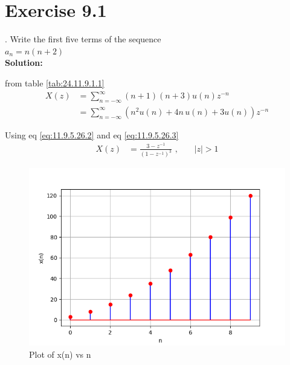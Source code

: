 \documentclass[journal,12pt,twocolumn]{IEEEtran}
\providecommand{\brak}[1]{\ensuremath{\left(#1\right)}}
\theoremstyle{remark}
\providecommand{\abs}[1]{\left\vert#1\right\vert}
\newcommand{\solution}{\noindent \textbf{Solution: }}
\begin{document}


\vspace{3cm}

\title{}
\author{EE23BTECH11024 - G.Karthik Yadav$^{*}$
}
\maketitle
\newpage
\bigskip




\section*{Exercise 9.1}
. \hspace{2pt}Write the first five terms of the sequence\\
$a_n = n \brak{n+2}$\\

\solution
\fi





from table \ref{tab:24.11.9.1.1}
\begin{align}
    X \brak{z} & = \sum_{n=-\infty}^{\infty}  \brak{n+1}\brak{n+3} u \brak{n}   z^{-n}  \\
    & = \sum_{n=-\infty}^{\infty}  \brak{n^{2}u\brak{n} + 4 n\, u\brak{n}  + 3u\brak{n} } z^{-n}
\end{align}    

Using  eq \eqref{eq:11.9.5.26.2} and eq \eqref{eq:11.9.5.26.3}
\begin{align}
     X \brak{z} & = \frac{ 3-z^{-1}}{\brak{1-z^{-1}}^3} \text{ ,}\qquad \abs{z}>1
\end{align}

\begin{figure}[ht]
   \centering
   \includegraphics[width=1\columnwidth]{ncert-maths/11/9/1/1/figs/plot1.png}
   \caption{Plot of x(n) vs n}
   \label{fig: 1.11.9.1.1}
\end{figure}
\end{document}
